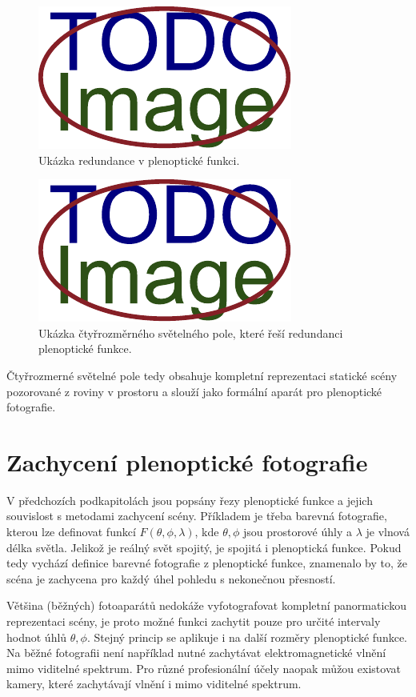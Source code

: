 \begin{figure}[h]
  \centering
  \includegraphics[width=.4\textwidth]{obrazky-figures/placeholder.pdf}
	\caption{Ukázka redundance v plenoptické funkci.}
	\label{redundance}
\end{figure}

\begin{figure}[h]
  \centering
  \includegraphics[width=.4\textwidth]{obrazky-figures/placeholder.pdf}
	\caption{Ukázka čtyřrozměrného světelného pole, které řeší redundanci plenoptické funkce.}
	\label{neredundance}
\end{figure}

Čtyřrozmerné světelné pole tedy obsahuje kompletní reprezentaci statické scény pozorované z roviny v prostoru a slouží jako formální aparát pro plenoptické fotografie.

\section{Zachycení plenoptické fotografie}
V předchozích podkapitolách jsou popsány řezy plenoptické funkce a jejich souvislost s metodami zachycení scény.
Příkladem je třeba barevná fotografie, kterou lze definovat funkcí $F(\theta, \phi, \lambda)$, kde $\theta, \phi$ jsou prostorové úhly a $\lambda$ je vlnová délka světla.
Jelikož je reálný svět spojitý, je spojitá i plenoptická funkce.
Pokud tedy vychází definice barevné fotografie z plenoptické funkce, znamenalo by to, že scéna je zachycena pro každý úhel pohledu s nekonečnou přesností.

Většina (běžných) fotoaparátů nedokáže vyfotografovat kompletní panormatickou reprezentaci scény, je proto možné funkci zachytit pouze pro určité intervaly hodnot úhlů $\theta, \phi$.
Stejný princip se aplikuje i na další rozměry plenoptické funkce.
Na běžné fotografii není například nutné zachytávat elektromagnetické vlnění mimo viditelné spektrum.
Pro různé profesionální účely naopak můžou existovat kamery, které zachytávají vlnění i mimo viditelné spektrum.

